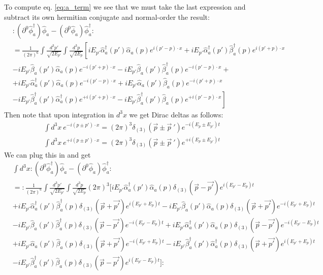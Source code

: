 To compute eq. \eqref{eq:a_term} we see that we must take the last expression and subtract its own hermitian conjugate and normal-order the result:
\begin{align*}
&:(\partial^0 \hat{\phi}_a^\dagger)\hat{\phi}_a-(\partial^0 \hat{\phi}_a)\hat{\phi}_a^\dagger:  \\ 
&= \frac{1}{(2\pi)^6} \int \frac{d^3 p'}{\sqrt{2E_{p'}}} \int \frac{d^3 p}{\sqrt{2E_p}} \left[ iE_{p'} \hat{\alpha}_a^\dagger (p') \hat{\alpha}_a (p) e^{i(p' - p) \cdot x} +  iE_{p'} \hat{\alpha}_a^\dagger (p') \hat{\beta}_a^\dagger (p) e^{i(p' + p) \cdot x} \right .\\
& - iE_{p'} \hat{\beta}_a (p') \hat{\alpha}_a (p) e^{-i(p' + p) \cdot x} - iE_{p'} \hat{\beta}_a (p') \hat{\beta}_a^\dagger (p) e^{-i(p' - p) \cdot x} 
+\\
&+iE_{p'} \hat{\alpha}_a^\dagger (p') \hat{\alpha}_a (p) e^{-i(p' - p) \cdot x} +  iE_{p'} \hat{\alpha}_a (p') \hat{\beta}_a (p) e^{-i(p' + p) \cdot x}  \\
&  - \left .iE_{p'} \hat{\beta}_a^\dagger (p') \hat{\alpha}_a^\dagger (p) e^{+i(p' + p) \cdot x} - iE_{p'} \hat{\beta}_a^\dagger (p') \hat{\beta}_a (p) e^{+i(p' - p) \cdot x} 
\right]
\end{align*}
Then note that upon integration in $d^3 x$ we get Dirac deltas as follows:
\begin{equation}
\begin{split}
    \int d^3 x ~ e^{-i(p\pm p')\cdot x} = (2\pi)^3 \delta_{(3)}(\vec p\pm {\vec p}~') e^{-i (E_p\pm E_{p'})t}\\
    \int d^3 x ~ e^{+i(p\pm p')\cdot x} = (2\pi)^3 \delta_{(3)}(\vec p\pm {\vec p}~') e^{+i (E_p\pm E_{p'})t}
\end{split}
\label{eq:diracDeltas}
\end{equation}
We can plug this in and get
\begin{align*}
&\int d^3 x:(\partial^0 \hat{\phi}_a^\dagger)\hat{\phi}_a-(\partial^0 \hat{\phi}_a)\hat{\phi}_a^\dagger:  \\ 
&= :\frac{1}{(2\pi)^6} \int \frac{d^3 p'}{\sqrt{2E_{p'}}} \int \frac{d^3 p}{\sqrt{2E_p}} (2\pi)^3 \Bigg[ iE_{p'} \hat{\alpha}_a^\dagger (p') \hat{\alpha}_a (p)   \delta_{(3)}(\vec{p} - \vec{p'}) e^{i(E_{p'} - E_p)t} \\
&+  iE_{p'} \hat{\alpha}_a^\dagger (p') \hat{\beta}_a^\dagger (p)   \delta_{(3)}(\vec{p} + \vec{p'}) e^{i(E_{p'} + E_p)t} - iE_{p'} \hat{\beta}_a (p') \hat{\alpha}_a (p)   \delta_{(3)}(\vec{p} + \vec{p'}) e^{-i(E_{p'} + E_p)t} \\
&- iE_{p'} \hat{\beta}_a (p') \hat{\beta}_a^\dagger (p)   \delta_{(3)}(\vec{p} - \vec{p'}) e^{-i(E_{p'} - E_p)t} + iE_{p'} \hat{\alpha}_a^\dagger (p') \hat{\alpha}_a (p)   \delta_{(3)}(\vec{p} - \vec{p'}) e^{-i(E_{p'} - E_p)t} \\
&+ iE_{p'} \hat{\alpha}_a (p') \hat{\beta}_a (p)   \delta_{(3)}(\vec{p} + \vec{p'}) e^{-i(E_{p'} + E_p)t} - iE_{p'} \hat{\beta}_a^\dagger (p') \hat{\alpha}_a^\dagger (p)   \delta_{(3)}(\vec{p} + \vec{p'}) e^{i(E_{p'} + E_p)t} \\
&- iE_{p'} \hat{\beta}_a^\dagger (p') \hat{\beta}_a (p)   \delta_{(3)}(\vec{p} - \vec{p'}) e^{i(E_{p'} - E_p)t} \Bigg]:
\end{align*}
